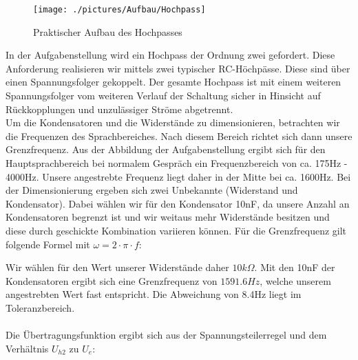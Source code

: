 \begin{figure}[htb]
    \texttt{[image: ./pictures/Aufbau/Hochpass]}
    \caption{Praktischer Aufbau des Hochpasses}
    \label{fig:HochpassPraktisch}
\end{figure}

In der Aufgabenstellung wird ein Hochpass der Ordnung zwei gefordert. Diese Anforderung realisieren wir mittels zwei typischer RC-Höchpässe. Diese sind über einen Spannungsfolger gekoppelt. Der gesamte Hochpass ist mit einem weiteren Spannungsfolger vom weiteren Verlauf der Schaltung sicher in Hinsicht auf Rückkopplungen und unzulässiger Ströme abgetrennt.
\\
Um die Kondensatoren und die Widerstände zu dimensionieren, betrachten wir die Frequenzen des Sprachbereiches. Nach diesem Bereich richtet sich dann unsere Grenzfrequenz. Aus der Abbildung der Aufgabenstellung ergibt sich für den Hauptsprachbereich bei normalem Gespräch ein Frequenzbereich von ca. 175Hz - 4000Hz. Unsere angestrebte Frequenz liegt daher in der Mitte bei ca. 1600Hz. Bei der Dimensionierung ergeben sich zwei Unbekannte (Widerstand und Kondensator). Dabei wählen wir für den Kondensator 10nF, da unsere Anzahl an Kondensatoren begrenzt ist und wir weitaus mehr Widerstände besitzen und diese durch geschickte Kombination variieren können. Für die Grenzfrequenz gilt folgende Formel mit $\omega = 2\cdot \pi \cdot f$: 


Wir wählen für den Wert unserer Widerstände daher $10k\Omega$. Mit den 10nF der Kondensatoren ergibt sich eine Grenzfrequenz von $1591.6Hz$, welche unserem angestrebten Wert fast entspricht. Die Abweichung von 8.4Hz liegt im Toleranzbereich.
\\
\\
Die Übertragungsfunktion ergibt sich aus der Spannungsteilerregel und dem Verhältnis $U_{h2}$ zu $U_{e}$:

